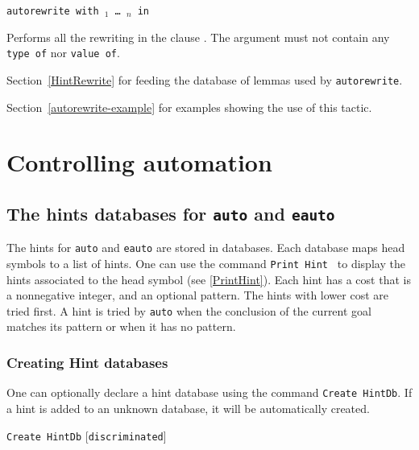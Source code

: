 \begin{coq_example*}
\begin{Variant}
\item {\tt autorewrite with \ident$_1$ \mbox{\dots} \ident$_n$ in }

  Performs all the rewriting  in the clause .
  The  argument must not contain any \texttt{type of} nor \texttt{value of}.

\end{Variant}

\SeeAlso Section~\ref{HintRewrite} for feeding the database of lemmas used by {\tt autorewrite}.

\SeeAlso Section~\ref{autorewrite-example} for examples showing the use of
this tactic.


\section{Controlling automation}

\subsection{The hints databases for {\tt auto} and {\tt eauto}}
\label{Hints-databases}

The hints for \texttt{auto} and \texttt{eauto} are stored in
databases.  Each database maps head symbols to a list of hints. One can
use the command \texttt{Print Hint \ident} to display the hints
associated to the head symbol \ident{} (see \ref{PrintHint}). Each
hint has a cost that is a nonnegative integer, and an optional pattern.
The hints with lower cost are tried first. A hint is tried by
\texttt{auto} when the conclusion of the current goal
matches its pattern or when it has no pattern.

\subsubsection*{Creating Hint databases
  \label{CreateHintDb}}

One can optionally declare a hint database using the command
\texttt{Create HintDb}. If a hint is added to an unknown database, it
will be automatically created.

\medskip
\texttt{Create HintDb} {\ident} [\texttt{discriminated}]
\medskip


\end{coq_example*}
